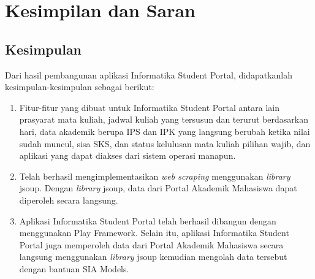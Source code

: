 \chapter{Kesimpilan dan Saran}
\label{chap:kesimpulan_saran}

\section{Kesimpulan}
\label{sec:kesimpulan}
Dari hasil pembangunan aplikasi Informatika Student Portal, didapatkanlah kesimpulan-kesimpulan sebagai berikut:
		\begin{enumerate}
			\item Fitur-fitur yang dibuat untuk Informatika Student Portal antara lain prasyarat mata kuliah, jadwal kuliah yang tersusun dan terurut berdasarkan hari, data akademik berupa IPS dan IPK yang langsung berubah ketika nilai sudah muncul, sisa SKS, dan status kelulusan mata kuliah pilihan wajib, dan aplikasi yang dapat diakses dari sistem operasi manapun.
			\item Telah berhasil mengimplementasikan \textit{web scraping} menggunakan \textit{library} jsoup. Dengan \textit{library} jsoup, data dari Portal Akademik Mahasiswa dapat diperoleh secara langsung.
			\item Aplikasi Informatika Student Portal telah berhasil dibangun dengan menggunakan Play Framework. Selain itu, aplikasi Informatika Student Portal juga memperoleh data dari Portal Akademik Mahasiswa secara langsung menggunakan \textit{library} jsoup kemudian mengolah data tersebut dengan bantuan SIA Models. 
		\end{enumerate}

